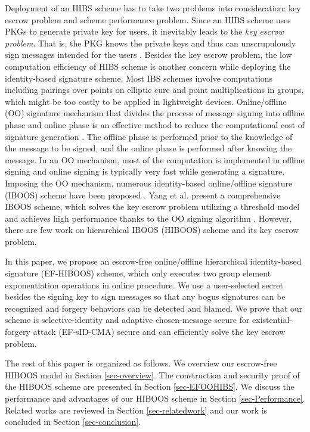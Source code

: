 \documentclass[times]{secauth}
\theoremstyle{definition}
\theoremstyle{remark}
\begin{document}
Deployment of an HIBS scheme has to take two problems into consideration: key escrow problem and scheme performance problem. 
Since an HIBS scheme uses PKGs to generate private key for users, it inevitably leads to the \emph{key escrow problem}. 
That is, the PKG knows the private keys and thus can unscrupulously sign messages intended for the users \cite{boneh2001identity}. 
Besides the key escrow problem, the low computation efficiency of HIBS scheme is another concern while deploying the identity-based signature scheme.
Most IBS schemes involve computations including pairings over points on elliptic cure and point multiplications in groups, which might be too costly to be applied in lightweight devices.
Online/offline (OO) signature mechanism that divides the process of message signing into offline phase and online phase is an effective method to reduce the computational cost of signature generation \cite{even1990line}. 
The offline phase is performed prior to the knowledge of the message to be signed, and the online phase is performed after knowing the message. 
In an OO mechanism, most of the computation is implemented in offline signing and online signing is typically very fast while generating a signature.
Imposing the OO mechanism, numerous identity-based online/offline signature (IBOOS) scheme have been proposed \cite{yang2013id,liu2011online,yasmin2010authentication,liu2010efficient,kar2014provably,lai2015improved}. 
Yang et al. present a comprehensive IBOOS scheme, which solves the key escrow problem utilizing a threshold model and achieves high performance thanks to the OO signing algorithm \cite{yang2013id}.
However, there are few work on hierarchical IBOOS (HIBOOS) scheme and its key escrow problem.  
\par

In this paper, we propose an escrow-free online/offline hierarchical identity-based signature (EF-HIBOOS) scheme, which only executes two group element exponentiation operations in online procedure. 
We use a user-selected secret besides the signing key to sign messages so that any bogus signatures can be recognized and forgery behaviors can be detected and blamed. 
We prove that our scheme is selective-identity and adaptive chosen-message secure for existential-forgery attack (EF-sID-CMA) secure and can efficiently solve the key escrow problem.
\par

The rest of this paper is organized as follows.
We overview our escrow-free HIBOOS model in Section \ref{sec-overview}. 
The construction and security proof of the HIBOOS scheme are presented in Section \ref{sec-EFOOHIBS}. 
We discuss the performance and advantages of our HIBOOS scheme in Section \ref{sec-Performance}.
Related works are reviewed in Section \ref{sec-relatedwork} and our work is concluded in Section \ref{sec-conclusion}.
\end{document}
